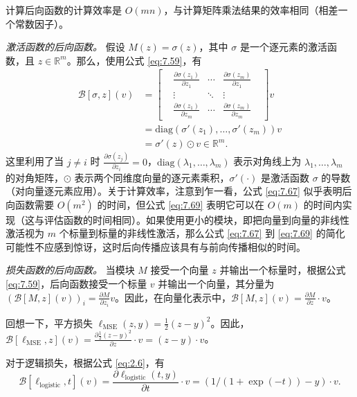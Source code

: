 计算后向函数的计算效率是 $O(mn)$，与计算矩阵乘法结果的效率相同（相差一个常数因子）。

\vspace{0.5em}
\noindent\textit{激活函数的后向函数。} 假设 $M(z) = \sigma(z)$，其中 $\sigma$ 是一个逐元素的激活函数，且 $z \in \mathbb{R}^m$。那么，使用公式 \eqref{eq:7.59}，有
\begin{align}
    \mathcal{B}[\sigma, z](v) &= \begin{bmatrix}
        &\frac{\partial \sigma(z_1)}{\partial z_1}& \cdots& \frac{\partial \sigma(z_m)}{\partial z_1}& \\
        &\vdots& \ddots& \vdots& \\
        &\frac{\partial \sigma(z_1)}{\partial z_m}& \cdots& \frac{\partial \sigma(z_m)}{\partial z_m}&
    \end{bmatrix} v \label{eq:7.67} \\
    &= \text{diag}(\sigma'(z_1), \dots, \sigma'(z_m))v \label{eq:7.68} \\
    &= \sigma'(z) \odot v \in \mathbb{R}^m. \label{eq:7.69}
\end{align}
这里利用了当 $j \neq i$ 时 $\frac{\partial \sigma(z_j)}{\partial z_i} = 0$，$\text{diag}(\lambda_1, \dots, \lambda_m)$ 表示对角线上为 $\lambda_1, \dots, \lambda_m$ 的对角矩阵，$\odot$ 表示两个同维度向量的逐元素乘积，$\sigma'(\cdot)$ 是激活函数 $\sigma$ 的导数（对向量逐元素应用）。关于计算效率，注意到乍一看，公式 \eqref{eq:7.67} 似乎表明后向函数需要 $O(m^2)$ 的时间，但公式 \eqref{eq:7.69} 表明它可以在 $O(m)$ 的时间内实现（这与评估函数的时间相同）。如果使用更小的模块，即把向量到向量的非线性激活视为 $m$ 个标量到标量的非线性激活，那么公式 \eqref{eq:7.67} 到 \eqref{eq:7.69} 的简化可能性不应感到惊讶，这时后向传播应该具有与前向传播相似的时间。

\vspace{0.5em}
\noindent\textit{损失函数的后向函数。} 当模块 $M$ 接受一个向量 $z$ 并输出一个标量时，根据公式 \eqref{eq:7.59}，后向函数接受一个标量 $v$ 并输出一个向量，其分量为 $(\mathcal{B}[M, z](v))_i = \frac{\partial M}{\partial z_i} v$。因此，在向量化表示中，$\mathcal{B}[M, z](v) = \frac{\partial M}{\partial z} \cdot v$。

回想一下，平方损失 $\ell_{\text{MSE}}(z, y) = \frac{1}{2}(z-y)^2$。因此，$\mathcal{B}[\ell_{\text{MSE}}, z](v) = \frac{\partial \frac{1}{2}(z-y)^2}{\partial z} \cdot v = (z-y) \cdot v$。

对于逻辑损失，根据公式 \eqref{eq:2.6}，有
\begin{equation}
    \mathcal{B}[\ell_{\text{logistic}}, t](v) = \frac{\partial \ell_{\text{logistic}}(t, y)}{\partial t} \cdot v = (1/(1 + \exp(-t)) - y) \cdot v. \label{eq:7.70}
\end{equation}

